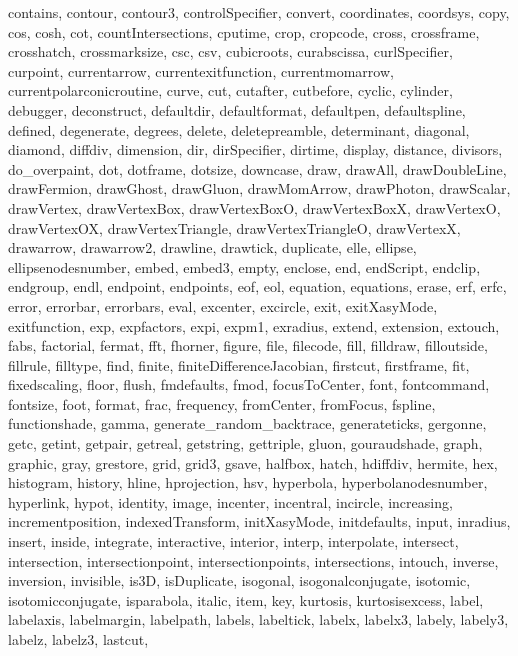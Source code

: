 {{  contains, contour, contour3, controlSpecifier, convert, coordinates,
  coordsys, copy, cos, cosh, cot, countIntersections, cputime, crop,
  cropcode, cross, crossframe, crosshatch, crossmarksize, csc, csv,
  cubicroots, curabscissa, curlSpecifier, curpoint, currentarrow,
  currentexitfunction, currentmomarrow, currentpolarconicroutine, curve, cut,
  cutafter, cutbefore, cyclic, cylinder, debugger, deconstruct, defaultdir,
  defaultformat, defaultpen, defaultspline, defined, degenerate, degrees,
  delete, deletepreamble, determinant, diagonal, diamond, diffdiv, dimension,
  dir, dirSpecifier, dirtime, display, distance, divisors, do_overpaint, dot,
  dotframe, dotsize, downcase, draw, drawAll, drawDoubleLine, drawFermion,
  drawGhost, drawGluon, drawMomArrow, drawPhoton, drawScalar, drawVertex,
  drawVertexBox, drawVertexBoxO, drawVertexBoxX, drawVertexO, drawVertexOX,
  drawVertexTriangle, drawVertexTriangleO, drawVertexX, drawarrow,
  drawarrow2, drawline, drawtick, duplicate, elle, ellipse,
  ellipsenodesnumber, embed, embed3, empty, enclose, end, endScript, endclip,
  endgroup, endl, endpoint, endpoints, eof, eol, equation, equations, erase,
  erf, erfc, error, errorbar, errorbars, eval, excenter, excircle, exit,
  exitXasyMode, exitfunction, exp, expfactors, expi, expm1, exradius, extend,
  extension, extouch, fabs, factorial, fermat, fft, fhorner, figure, file,
  filecode, fill, filldraw, filloutside, fillrule, filltype, find, finite,
  finiteDifferenceJacobian, firstcut, firstframe, fit, fixedscaling, floor,
  flush, fmdefaults, fmod, focusToCenter, font, fontcommand, fontsize, foot,
  format, frac, frequency, fromCenter, fromFocus, fspline, functionshade,
  gamma, generate_random_backtrace, generateticks, gergonne, getc, getint,
  getpair, getreal, getstring, gettriple, gluon, gouraudshade, graph,
  graphic, gray, grestore, grid, grid3, gsave, halfbox, hatch, hdiffdiv,
  hermite, hex, histogram, history, hline, hprojection, hsv, hyperbola,
  hyperbolanodesnumber, hyperlink, hypot, identity, image, incenter,
  incentral, incircle, increasing, incrementposition, indexedTransform,
  initXasyMode, initdefaults, input, inradius, insert, inside, integrate,
  interactive, interior, interp, interpolate, intersect, intersection,
  intersectionpoint, intersectionpoints, intersections, intouch, inverse,
  inversion, invisible, is3D, isDuplicate, isogonal, isogonalconjugate,
  isotomic, isotomicconjugate, isparabola, italic, item, key, kurtosis,
  kurtosisexcess, label, labelaxis, labelmargin, labelpath, labels,
  labeltick, labelx, labelx3, labely, labely3, labelz, labelz3, lastcut,
}}
